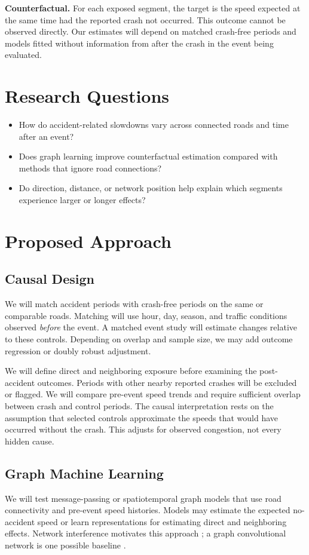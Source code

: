 \documentclass[sigconf,nonacm]{acmart}
\begin{document}
\textbf{Counterfactual.} For each exposed segment, the target is the
speed expected at the same time had the reported crash not occurred.
This outcome cannot be observed directly. Our estimates will depend
on matched crash-free periods and models fitted without information
from after the crash in the event being evaluated.

\section{Research Questions}
\begin{itemize}
    \item How do accident-related slowdowns vary across connected
    roads and time after an event?
    \item Does graph learning improve counterfactual estimation
    compared with methods that ignore road connections?
    \item Do direction, distance, or network position help explain
    which segments experience larger or longer effects?
\end{itemize}

\section{Proposed Approach}
\subsection{Causal Design}
We will match accident periods with crash-free periods on the same or
comparable roads. Matching will use hour, day, season, and traffic
conditions observed \emph{before} the event. A matched event study
will estimate changes relative to these controls. Depending on overlap
and sample size, we may add outcome regression or doubly robust
adjustment.

We will define direct and neighboring exposure before examining the
post-accident outcomes. Periods with other nearby reported crashes
will be excluded or flagged. We will compare pre-event speed trends
and require sufficient overlap between crash and control periods.
The causal interpretation rests on the assumption that selected
controls approximate the speeds that would have occurred without the
crash. This adjusts for observed congestion, not every hidden cause.

\subsection{Graph Machine Learning}
We will test message-passing or spatiotemporal graph models that use
road connectivity and pre-event speed histories. Models may estimate
the expected no-accident speed or learn representations for estimating
direct and neighboring effects. Network interference motivates this
approach \cite{ma2021interference}; a graph convolutional network is
one possible baseline \cite{kipf2017gcn}.
\end{document}
